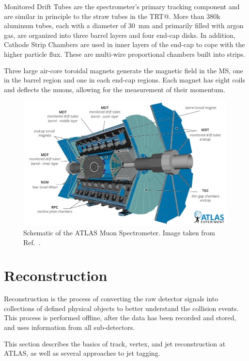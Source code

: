 Monitored Drift Tubes are the spectrometer's primary tracking component and are similar in principle to the straw tubes in the TRT@.
More than 380k aluminum tubes, each with a diameter of $30$~mm and primarily filled with argon gas, are organized into three barrel layers and four end-cap disks.
In addition, Cathode Strip Chambers are used in inner layers of the end-cap to cope with the higher particle flux.
These are multi-wire proportional chambers built into strips.

Three large air-core toroidal magnets generate the magnetic field in the MS\@, one in the barrel region and one in each end-cap regions.
Each magnet has eight coils and deflects the muons, allowing for the measurement of their momentum.

\begin{figure}[htb]
    \centering
    \includegraphics[width=0.99\textwidth]{Figures/cern_atlas/MS.png}
    \caption{Schematic of the ATLAS Muon Spectrometer. Image taken from Ref.~\cite{ATLASRun3}.}
    \label{fig:atlas_muon_spectrometer}
\end{figure}

\section{Reconstruction}
\label{sec:event_reconstruction}

Reconstruction is the process of converting the raw detector signals into collections of defined physical objects to better understand the collision events.
This process is performed offline, after the data has been recorded and stored, and uses information from all sub-detectors.

This section describes the basics of track, vertex, and jet reconstruction at ATLAS, as well as several approaches to jet tagging.

